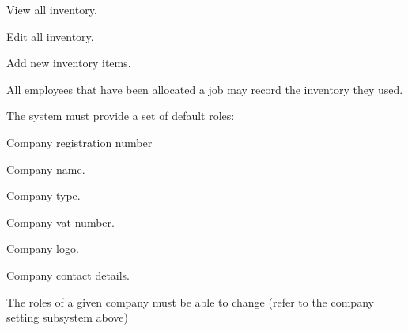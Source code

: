\documentclass{article}
\begin{document}
\begin{list}{R.}{}
\begin{list}{R.}{}
\begin{list}{R...}{}
				\item View all inventory.
				\item Edit all inventory.
				\item Add new inventory items.
				\item All employees that have been allocated a job may record the inventory they used.
			\end{list}
		\end{list} 
		\item The system must provide a set of default roles:
		\begin{list}{R.}{}
			\item Company registration number
			\item Company name.
			\item Company type.
			\item Company vat number.
			\item Company logo.
			\item Company contact details.
		\end{list} 
		\item The roles of a given company must be able to change (refer to the company setting subsystem above)
	\end{list}
\end{document}
